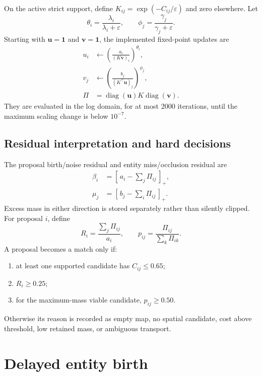 \documentclass[11pt]{article}
\newcommand{\1}{\bm{1}}
\newcommand{\pospart}[1]{[\,#1\,]_{+}}
\begin{document}
On the active strict support, define $K_{ij}=\exp(-C_{ij}/\varepsilon)$ and zero
elsewhere. Let
\begin{equation}
\theta_i=\frac{\lambda_i}{\lambda_i+\varepsilon},\qquad
\phi_j=\frac{\gamma_j}{\gamma_j+\varepsilon}.
\end{equation}
Starting with $\bm u=\1$ and $\bm v=\1$, the implemented fixed-point updates
are
\begin{align}
u_i&\leftarrow\left(\frac{a_i}{(K\bm v)_i}\right)^{\theta_i},\\
v_j&\leftarrow\left(\frac{b_j}{(K^\top\bm u)_j}\right)^{\phi_j},\\
\Pi&=\operatorname{diag}(\bm u)K\operatorname{diag}(\bm v).
\end{align}
They are evaluated in the log domain, for at most 2000 iterations, until the
maximum scaling change is below $10^{-7}$.

\subsection{Residual interpretation and hard decisions}

The proposal birth/noise residual and entity miss/occlusion residual are
\begin{align}
\beta_i&=\pospart{a_i-\sum_j\Pi_{ij}},\\
\mu_j&=\pospart{b_j-\sum_i\Pi_{ij}}.
\end{align}
Excess mass in either direction is stored separately rather than silently
clipped. For proposal $i$, define
\begin{equation}
R_i=\frac{\sum_j\Pi_{ij}}{a_i},\qquad
p_{ij}=\frac{\Pi_{ij}}{\sum_k\Pi_{ik}}.
\end{equation}
A proposal becomes a match only if:
\begin{enumerate}[leftmargin=*]
    \item at least one supported candidate has $C_{ij}\leq0.65$;
    \item $R_i\geq0.25$;
    \item for the maximum-mass viable candidate, $p_{ij}\geq0.50$.
\end{enumerate}
Otherwise its reason is recorded as empty map, no spatial candidate, cost above
threshold, low retained mass, or ambiguous transport.

\section{Delayed entity birth}
\end{document}
